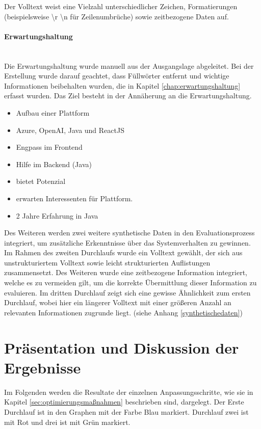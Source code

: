 Der Volltext weist eine Vielzahl unterschiedlicher Zeichen, Formatierungen (beispielsweise \textbackslash r \textbackslash n für Zeilenumbrüche) sowie zeitbezogene Daten auf.
\paragraph{Erwartungshaltung}\mbox{}\\
Die Erwartungshaltung wurde manuell aus der Ausgangslage abgeleitet. Bei der Erstellung wurde darauf geachtet, dass Füllwörter entfernt und wichtige Informationen beibehalten wurden, die in Kapitel \ref{chap:erwartungshaltung} erfasst wurden. Das Ziel besteht in der Annäherung an die Erwartungshaltung.
\begin{itemize}
	\itemsep-0.5em
	\item Aufbau einer Plattform
	\item Azure, OpenAI, Java und ReactJS
	\item Engpass im Frontend
	\item Hilfe im Backend (Java)
	\item bietet Potenzial
	\item erwarten Interessenten für Plattform.
	\item 2 Jahre Erfahrung in Java
\end{itemize}
Des Weiteren werden zwei weitere synthetische Daten in den Evaluationsprozess integriert, um zusätzliche Erkenntnisse über das Systemverhalten zu gewinnen. Im Rahmen des zweiten Durchlaufs wurde ein Volltext gewählt, der sich aus unstrukturiertem Volltext sowie leicht strukturierten Auflistungen zusammensetzt. Des Weiteren wurde eine zeitbezogene Information integriert, welche es zu vermeiden gilt, um die korrekte Übermittlung dieser Information zu evaluieren. Im dritten Durchlauf zeigt sich eine gewisse Ähnlichkeit zum ersten Durchlauf, wobei hier ein längerer Volltext mit einer größeren Anzahl an relevanten Informationen zugrunde liegt. (siehe Anhang \ref{synthetischedaten})
\section{Präsentation und Diskussion der Ergebnisse}
Im Folgenden werden die Resultate der einzelnen Anpassungsschritte, wie sie in Kapitel \ref{sec:optimierungsmaßnahmen} beschrieben sind, dargelegt. Der Erste Durchlauf ist in den Graphen mit der Farbe Blau markiert. Durchlauf zwei ist mit Rot und drei ist mit Grün markiert.
